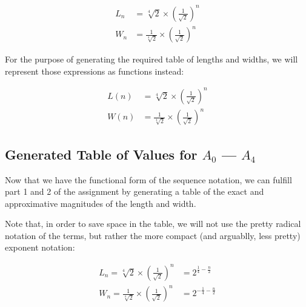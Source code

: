 \begin{align*}
  L_n &= \sqrt[4]{2} \times \left(\frac{1}{\sqrt{2}}\right)^{n} \\
  W_n &= \frac{1}{\sqrt[4]{2}} \times \left(\frac{1}{\sqrt{2}}\right)^{n}
\end{align*}

\noindent
For the purpose of generating the required table of lengths and widths, we will represent those expressions as functions instead:

\begin{align*}
  L(n) &= \sqrt[4]{2} \times \left(\frac{1}{\sqrt{2}}\right)^{n} \\
  W(n) &= \frac{1}{\sqrt[4]{2}} \times \left(\frac{1}{\sqrt{2}}\right)^{n}
\end{align*}

\subsection*{Generated Table of Values for $A_0$ --- $A_4$}
Now that we have the functional form of the sequence notation, we can fulfill part 1 and 2 of the assignment by generating a table of the exact and approximative magnitudes of the length and width.

\noindent
Note that, in order to save space in the table, we will not use the pretty radical notation of the terms, but rather the more compact (and arguablly, less pretty) exponent notation:

\begin{align*}
  L_n = \sqrt[4]{2} \times \left(\frac{1}{\sqrt{2}}\right)^{n} &=
  2^{\frac{1}{4} - \frac{n}{2}}\\
  W_n = \frac{1}{\sqrt[4]{2}} \times \left(\frac{1}{\sqrt{2}}\right)^{n} &=
  2^{-\frac{1}{4} - \frac{n}{2}}\\
\end{align*}

